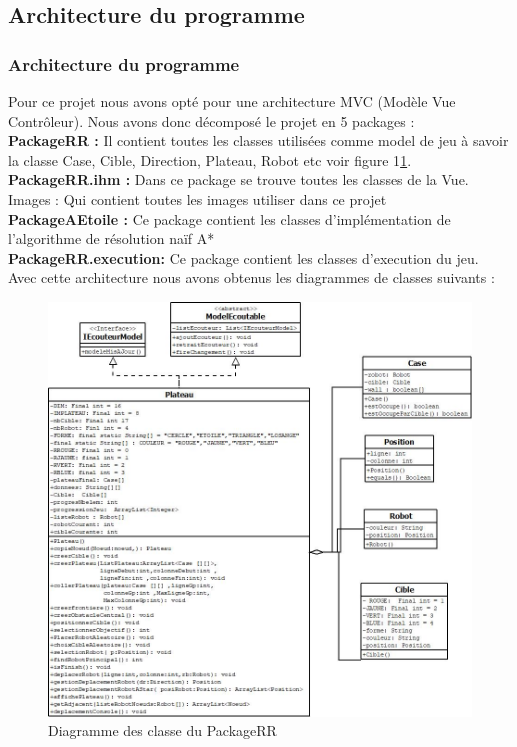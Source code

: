 \documentclass{beamer}
\begin{document}
	\subsection{Architecture du programme}
	\begin{frame}
		\frametitle{Architecture du programme}
		
		Pour ce projet nous avons opté pour une architecture MVC (Modèle Vue Contrôleur). Nous avons donc décomposé le projet en 5 packages :
		\\\textbf{PackageRR :} Il contient toutes les classes utilisées comme model de jeu à savoir la classe Case, Cible, Direction, Plateau, Robot etc voir figure 1\ref{figure1}.
		\\\textbf{PackageRR.ihm : } Dans ce package se trouve toutes les classes de la Vue.
		Images : Qui contient toutes les images utiliser dans ce projet 
		\\\textbf{PackageAEtoile : } Ce package contient les classes d’implémentation de l’algorithme de résolution naïf A*
		\\\textbf{PackageRR.execution:}  Ce package contient les classes d'execution du jeu.
		\\Avec cette architecture nous avons obtenus les diagrammes de classes suivants :
		
	\end{frame}
	
	\begin{frame}
		\begin{figure}[htpb]
			\includegraphics[scale=0.3]{./images/rr.jpg}
			\caption{Diagramme des classe du PackageRR \label{figure1} }
		\end{figure}
	\end{frame}
\end{document}
